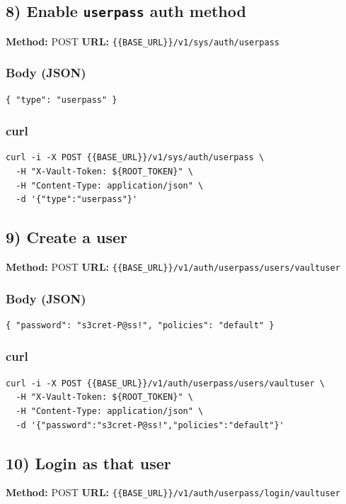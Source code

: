 \documentclass[11pt]{article}
\begin{document}
\subsection{8) Enable \texttt{userpass} auth method}
\textbf{Method:} POST \quad \textbf{URL:} \texttt{\{\{BASE\_URL\}\}/v1/sys/auth/userpass}

\subsubsection*{Body (JSON)}
\begin{verbatim}
{ "type": "userpass" }
\end{verbatim}

\subsubsection*{curl}
\begin{verbatim}
curl -i -X POST {{BASE_URL}}/v1/sys/auth/userpass \
  -H "X-Vault-Token: ${ROOT_TOKEN}" \
  -H "Content-Type: application/json" \
  -d '{"type":"userpass"}'
\end{verbatim}

\subsection{9) Create a user}
\textbf{Method:} POST \quad \textbf{URL:} \texttt{\{\{BASE\_URL\}\}/v1/auth/userpass/users/vaultuser}

\subsubsection*{Body (JSON)}
\begin{verbatim}
{ "password": "s3cret-P@ss!", "policies": "default" }
\end{verbatim}

\subsubsection*{curl}
\begin{verbatim}
curl -i -X POST {{BASE_URL}}/v1/auth/userpass/users/vaultuser \
  -H "X-Vault-Token: ${ROOT_TOKEN}" \
  -H "Content-Type: application/json" \
  -d '{"password":"s3cret-P@ss!","policies":"default"}'
\end{verbatim}

\subsection{10) Login as that user}
\textbf{Method:} POST \quad \textbf{URL:} \texttt{\{\{BASE\_URL\}\}/v1/auth/userpass/login/vaultuser}
\end{document}
